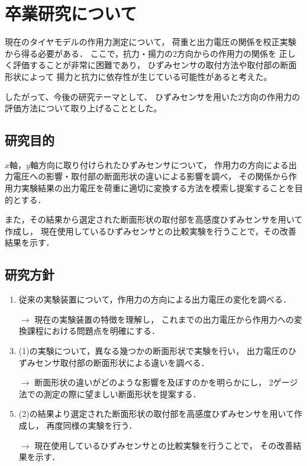 \documentclass[twocolumn,a4j]{jsarticle}
\begin{document}
\newpage

\section{卒業研究について}

現在のタイヤモデルの作用力測定について，
荷重と出力電圧の関係を校正実験から得る必要がある．
ここで，抗力・揚力の2方向からの作用力の関係を
正しく評価することが非常に困難であり，
ひずみセンサの取付方法や取付部の断面形状によって
揚力と抗力に依存性が生じている可能性があると考えた。\par
したがって、今後の研究テーマとして、
ひずみセンサを用いた2方向の作用力の評価方法について取り上げることとした。\\

\subsection{研究目的}
    $x$軸，$y$軸方向に取り付けられたひずみセンサについて，
    作用力の方向による出力電圧への影響・取付部の断面形状の違いによる影響を調べ，
    その関係から作用力実験結果の出力電圧を荷重に適切に変換する方法を模索し提案することを目的とする．
    \par
    また，その結果から選定された断面形状の取付部を高感度ひずみセンサを用いて作成し，
    現在使用しているひずみセンサとの比較実験を行うことで，その改善結果を示す．\\

\subsection{研究方針}
    \begin{enumerate}[(1)]
        \item 従来の実験装置について，作用力の方向による出力電圧の変化を調べる．
        \item [$\rightarrow$] 現在の実験装置の特徴を理解し，
              これまでの出力電圧から作用力への変換課程における問題点を明確にする．
        \item (1)の実験について，異なる幾つかの断面形状で実験を行い，
              出力電圧のひずみセンサ取付部の断面形状による違いを調べる．
        \item [$\rightarrow$] 断面形状の違いがどのような影響を及ぼすのかを明らかにし，
              2ゲージ法での測定の際に望ましい断面形状を提案する．
        \item (2)の結果より選定された断面形状の取付部を高感度ひずみセンサを用いて作成し，
              再度同様の実験を行う．
        \item [$\rightarrow$] 現在使用しているひずみセンサとの比較実験を行うことで，
              その改善結果を示す．
    \end{enumerate}
\end{document}
